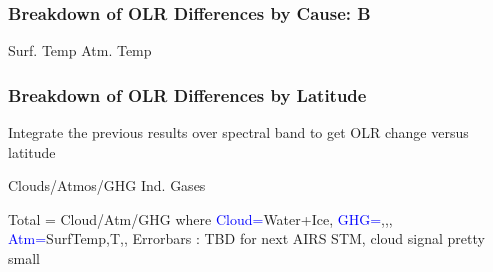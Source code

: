 \documentclass[10pt,t]{beamer}
\begin{document}
\begin{frame}
  \frametitle{Breakdown of OLR Differences by Cause: B}
  \hspace{0.50in} Surf. Temp  \hspace{1.5in} Atm. Temp \\
  \begin{center}
  \end{center}
\end{frame}

\begin{frame}
  \frametitle{Breakdown of OLR Differences by Latitude}
  Integrate the previous results over spectral band to get OLR change versus latitude
  
  \hspace{0.50in} Clouds/Atmos/GHG  \hspace{1.5in} Ind. Gases \\
  \begin{center}
  \end{center}
 Total = Cloud/Atm/GHG where \newline
 \textcolor{blue}{Cloud=}Water+Ice, \textcolor{blue}{GHG=}\cd,\methane,\nitrous, \textcolor{blue}{Atm=}SurfTemp,T,\water,\ozone \newline
 Errorbars : TBD for next AIRS STM, cloud signal pretty small
\end{frame}
\end{document}
